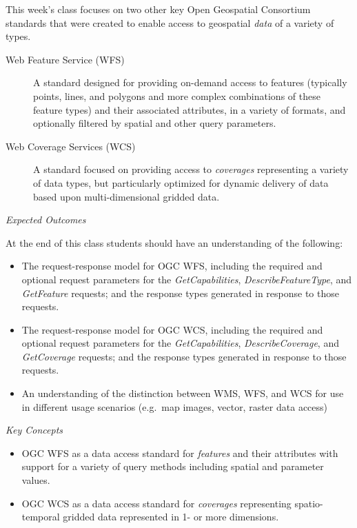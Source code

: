 \documentclass[]{book}
\begin{document}
This week's class focuses on two other key Open Geospatial Consortium
standards that were created to enable access to geospatial \emph{data}
of a variety of types.

\begin{description}
\item[Web Feature Service (WFS)]
A standard designed for providing on-demand access to features
(typically points, lines, and polygons and more complex combinations of
these feature types) and their associated attributes, in a variety of
formats, and optionally filtered by spatial and other query parameters.
\item[Web Coverage Services (WCS)]
A standard focused on providing access to \emph{coverages} representing
a variety of data types, but particularly optimized for dynamic delivery
of data based upon multi-dimensional gridded data.
\end{description}

\emph{Expected Outcomes}

At the end of this class students should have an understanding of the
following:

\begin{itemize}
\item
  The request-response model for OGC WFS, including the required and
  optional request parameters for the \emph{GetCapabilities},
  \emph{DescribeFeatureType}, and \emph{GetFeature} requests; and the
  response types generated in response to those requests.
\item
  The request-response model for OGC WCS, including the required and
  optional request parameters for the \emph{GetCapabilities},
  \emph{DescribeCoverage}, and \emph{GetCoverage} requests; and the
  response types generated in response to those requests.
\item
  An understanding of the distinction between WMS, WFS, and WCS for use
  in different usage scenarios (e.g.~map images, vector, raster data
  access)
\end{itemize}

\emph{Key Concepts}

\begin{itemize}
\item
  OGC WFS as a data access standard for \emph{features} and their
  attributes with support for a variety of query methods including
  spatial and parameter values.
\item
  OGC WCS as a data access standard for \emph{coverages} representing
  spatio-temporal gridded data represented in 1- or more dimensions.
\end{itemize}
\end{document}
